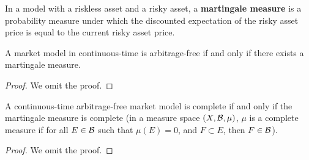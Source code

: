 \documentclass[11pt,fleqn]{book} %
\begin{document}
\begin{definition} \label{def:425}
\label{Martingale measure}
In a model with a riskless asset and a risky asset, a \textbf{martingale measure} is a probability measure under which the discounted expectation of the risky asset price is equal to the current risky asset price.
\end{definition}

\begin{theorem} \label{thm:426}
A market model in continuous-time is arbitrage-free if and only if there exists a martingale measure.
\end{theorem}
\begin{proof}
We omit the proof.
\end{proof}

\begin{theorem} \label{thm:427}
A continuous-time arbitrage-free market model is complete if and only if the martingale measure is complete (in a measure space \((X, \mathcal{B}, \mu)\), \(\mu\) is a complete measure if for all \(E \in \mathcal{B}\) such that \(\mu(E) = 0\), and \(F \subset E\), then \(F \in \mathcal{B}\)).
\end{theorem}
\begin{proof}
We omit the proof.
\end{proof}
\end{document}

